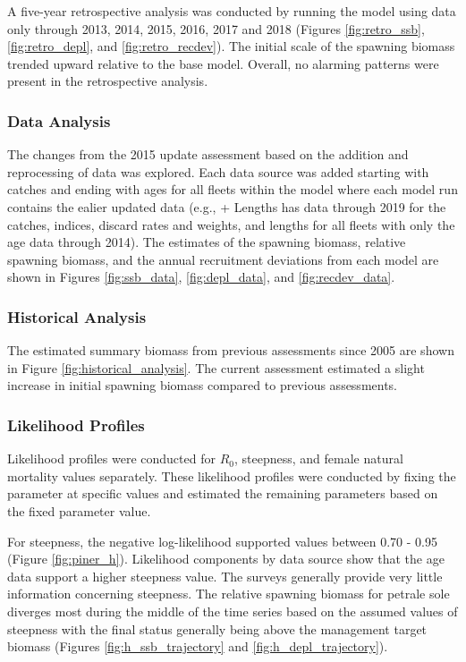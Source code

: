\documentclass[12pt,]{article}
\begin{document}
A five-year retrospective analysis was conducted by running the model
using data only through 2013, 2014, 2015, 2016, 2017 and 2018 (Figures
\ref{fig:retro_ssb}, \ref{fig:retro_depl}, and \ref{fig:retro_recdev}).
The initial scale of the spawning biomass trended upward relative to the
base model. Overall, no alarming patterns were present in the
retrospective analysis.

\subsubsection{Data Analysis}\label{data-analysis}

The changes from the 2015 update assessment based on the addition and
reprocessing of data was explored. Each data source was added starting
with catches and ending with ages for all fleets within the model where
each model run contains the ealier updated data (e.g., + Lengths has
data through 2019 for the catches, indices, discard rates and weights,
and lengths for all fleets with only the age data through 2014). The
estimates of the spawning biomass, relative spawning biomass, and the
annual recruitment deviations from each model are shown in Figures
\ref{fig:ssb_data}, \ref{fig:depl_data}, and \ref{fig:recdev_data}.

\subsubsection{Historical Analysis}\label{historical-analysis}

The estimated summary biomass from previous assessments since 2005 are
shown in Figure \ref{fig:historical_analysis}. The current assessment
estimated a slight increase in initial spawning biomass compared to
previous assessments.

\subsubsection{Likelihood Profiles}\label{likelihood-profiles}

Likelihood profiles were conducted for \(R_0\), steepness, and female
natural mortality values separately. These likelihood profiles were
conducted by fixing the parameter at specific values and estimated the
remaining parameters based on the fixed parameter value.

For steepness, the negative log-likelihood supported values between 0.70
- 0.95 (Figure \ref{fig:piner_h}). Likelihood components by data source
show that the age data support a higher steepness value. The surveys
generally provide very little information concerning steepness. The
relative spawning biomass for petrale sole diverges most during the
middle of the time series based on the assumed values of steepness with
the final status generally being above the management target biomass
(Figures \ref{fig:h_ssb_trajectory} and \ref{fig:h_depl_trajectory}).
\end{document}

